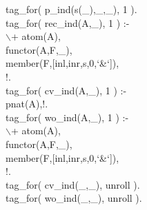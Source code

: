 \documentclass[11pt]{report}
\begin{document}
\begin{sf}
\begin{tabbing}
tag\_\hspace{0.1em}for( p\_\hspace{0.1em}ind(s(\_\hspace{0.1em}),\_\hspace{0.1em},\_\hspace{0.1em}), 1 ).\\[-0.15ex]
tag\_\hspace{0.1em}for( rec\_\hspace{0.1em}ind(A,\_\hspace{0.1em}), 1 ) :-\\[-0.15ex]
\hspace{2em}$\backslash$+ atom(A),\\[-0.15ex]
\hspace{2em}functor(A,F,\_\hspace{0.1em}),\\[-0.15ex]
\hspace{2em}member(F,[inl,inr,s,0,`\&`]),\\[-0.15ex]
\hspace{2em}!.\\[-0.15ex]
tag\_\hspace{0.1em}for( cv\_\hspace{0.1em}ind(A,\_\hspace{0.1em}), 1 ) :-\\[-0.15ex]
\hspace{2em}pnat(A),!.\\[-0.15ex]
tag\_\hspace{0.1em}for( wo\_\hspace{0.1em}ind(A,\_\hspace{0.1em}), 1 ) :-\\[-0.15ex]
\hspace{2em}$\backslash$+ atom(A),\\[-0.15ex]
\hspace{2em}functor(A,F,\_\hspace{0.1em}),\\[-0.15ex]
\hspace{2em}member(F,[inl,inr,s,0,`\&`]),\\[-0.15ex]
\hspace{2em}!.\\[-0.15ex]
tag\_\hspace{0.1em}for( cv\_\hspace{0.1em}ind(\_\hspace{0.1em},\_\hspace{0.1em}), unroll ).\\[-0.15ex]
tag\_\hspace{0.1em}for( wo\_\hspace{0.1em}ind(\_\hspace{0.1em},\_\hspace{0.1em}), unroll ).\\[-0.15ex]

\end{tabbing}
\end{sf}
\end{document}
